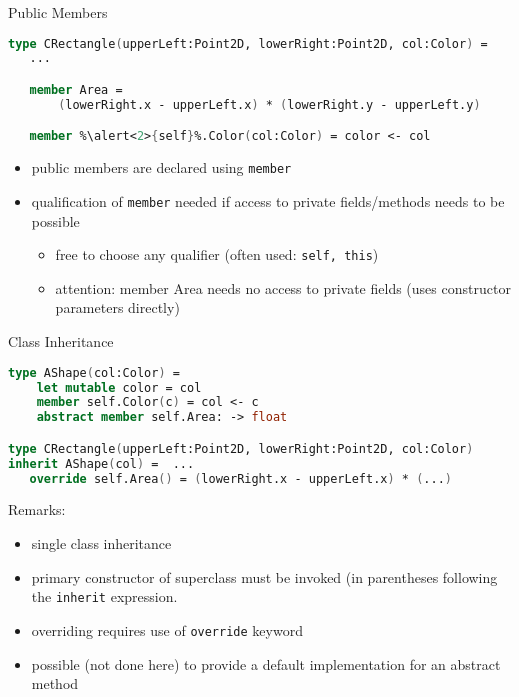 \documentclass{beamer}
\newcommand{\Blue}[1]{\color{blue}#1\color{black}\xspace}
\begin{document}
\begin{frame}[fragile]{Public Members}
\begin{lstlisting}[language=FSharp, escapechar=\%]
   type CRectangle(upperLeft:Point2D, lowerRight:Point2D, col:Color) =
   ...

   member Area =
       (lowerRight.x - upperLeft.x) * (lowerRight.y - upperLeft.y)

   member %\alert<2>{self}%.Color(col:Color) = color <- col
\end{lstlisting}

\begin{overlayarea}{\textwidth}{0.3\textheight}
\begin{itemize}
 \item<+-> public members are declared using \lstinline!member!
 \item<+-> qualification of \lstinline!member! needed if access to
   private fields/methods needs to be possible
   \begin{itemize}
     \item free to choose any qualifier (often used: \lstinline!self, this!)
     \item attention: member Area needs no access to private fields
       (uses constructor parameters directly)
  \end{itemize}
\end{itemize}
\end{overlayarea}
\end{frame}

\begin{frame}[fragile]{Class Inheritance}
\begin{lstlisting}[language=FSharp, escapechar=\%]
type AShape(col:Color) =
    let mutable color = col
    member self.Color(c) = col <- c 
    abstract member self.Area: -> float

type CRectangle(upperLeft:Point2D, lowerRight:Point2D, col:Color) 
inherit AShape(col) =  ...
   override self.Area() = (lowerRight.x - upperLeft.x) * (...)
\end{lstlisting}

\Blue{Remarks:}
\begin{overlayarea}{\textwidth}{0.6\textheight}
\begin{itemize}
 \item<+-> single class inheritance
 \item<+-> primary constructor of superclass must be invoked (in
   parentheses following the \lstinline!inherit! expression.
 \item<+-> overriding requires use of \lstinline!override! keyword 
 \item<+-> possible (not done here) to provide a default
   implementation for an abstract method
\end{itemize}
\end{overlayarea}
\end{frame}
\end{document}
